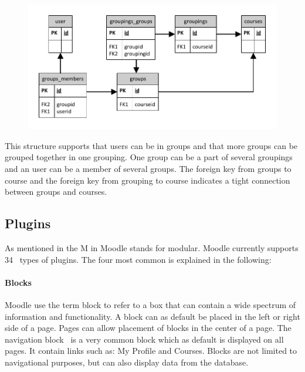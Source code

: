 \begin{figure}
	\centering
		\includegraphics[width=\textwidth]{images/moodlegroups}
	\label{fig:moodlegroupsandgroupings}
\end{figure}

This structure supports that users can be in groups and that more groups can be grouped together in one grouping. 
One group can be a part of several groupings and an user can be a member of several groups. 
The foreign key from groups to course and the foreign key from grouping to course indicates a tight connection between groups and courses. 

\subsection{Plugins}
\label{sub:plugins}
As mentioned in  the M in Moodle stands for modular. 
Moodle currently supports 34~\cite{plugin} types of plugins.
The four most common is explained in the following:




\paragraph{Blocks}
\label{subsec:blocks}
Moodle use the term block to refer to a box that can contain a wide spectrum of information and functionality.
A block can as default be placed in the left or right side of a page. 
Pages can allow placement of blocks in the center of a page.
The navigation block~\cite{navigationblock} is a very common block which as default is displayed on all pages. 
It contain links such as: My Profile and Courses. 
Blocks are not limited to navigational purposes, but can also display data from the database.

